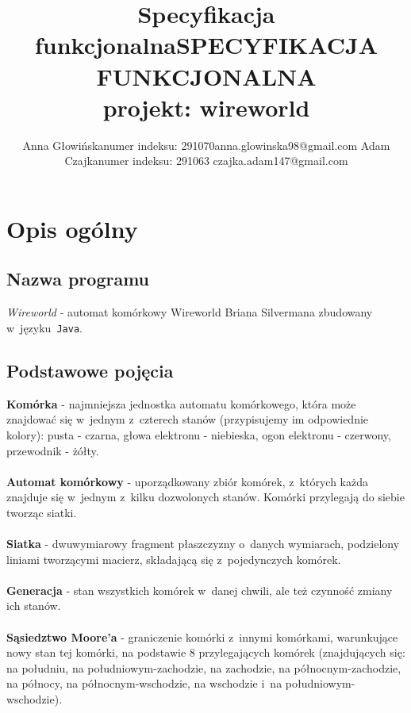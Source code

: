 \documentclass[a4paper,12pt,oneside]{article}
\begin{document}
\makeatother

\title{Specyfikacja funkcjonalna}

\title{SPECYFIKACJA FUNKCJONALNA\\projekt: wireworld}

\author{Anna Głowińska\newline numer indeksu: 291070\newline anna.glowinska98@gmail.com \newline \newline
Adam Czajka\newline numer indeksu: 291063 \newline czajka.adam147@gmail.com}

\maketitle
\tableofcontents
\thispagestyle{fancy}
\newpage
\section{Opis ogólny}

\subsection{Nazwa programu}

\textit{Wireworld} - automat komórkowy Wireworld Briana Silvermana zbudowany w~języku~\verb+Java+.

\subsection{Podstawowe pojęcia}

\noindent   \textbf{Komórka} - najmniejsza jednostka automatu komórkowego, która może znajdować się w~jednym z~czterech stanów (przypisujemy im odpowiednie kolory): pusta - czarna, głowa elektronu - niebieska, ogon elektronu - czerwony, przewodnik - żółty.
\\\\
\textbf{Automat komórkowy} - uporządkowany zbiór komórek, z~których każda znajduje się w~jednym z~kilku dozwolonych stanów. Komórki przylegają do siebie tworząc siatki.
\\\\
\textbf{Siatka} - dwuwymiarowy fragment płaszczyzny o~danych wymiarach, podzielony liniami tworzącymi macierz, składającą się z~pojedynczych komórek.
\\\\
\textbf{Generacja} - stan wszystkich komórek w~danej chwili, ale też czynność zmiany ich stanów.
\\\\
\textbf{Sąsiedztwo Moore'a} - graniczenie komórki z~innymi komórkami, warunkujące nowy stan tej komórki, na podstawie 8 przylegających komórek (znajdujących się: na południu, na południowym-zachodzie, na zachodzie, na północnym-zachodzie, na północy, na północnym-wschodzie, na wschodzie i~na południowym-wschodzie).
\end{document}
